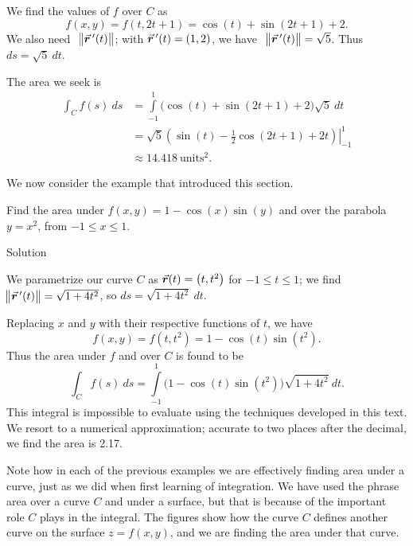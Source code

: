 \begin{example}
We find the values of $f$ over $C$ as $$f(x,y) = f(t,2t+1) = \cos(t)+\sin(2t+1) + 2.$$ We also need \ $\norm{\vec r\,'(t)}$; with $\vrp(t) = \left(1,2\right)$, we have \ $\norm{\vrp(t)} = \sqrt{5}$. Thus $ds = \sqrt{5}\ dt$. 



The area we seek is 
\begin{align*}
\int_Cf(s)\ ds &= \int\limits_{-1}^1 \big(\cos(t)+\sin(2t+1) + 2\big)\sqrt{5}\ dt \\
					&= \left.\sqrt{5}\left(\sin(t) - \frac12\cos(2t+1)+2t\right)\right|_{-1}^1\\
					&\approx 14.418\ \text{units}^2.
\end{align*}



\end{example}

We now consider the example that introduced this section.\\

\begin{example}\label{ex_linescalarfield5}
Find the area under $f(x,y) = 1-\cos(x)\sin(y)$ and over the parabola $y = x^2$, from $-1\leq x\leq 1$. 

Solution 

We parametrize our curve $C$ as $\vrt = \left( t,t^2\right)$ for $-1\leq t\leq 1$; we find $\norm{\vrp(t)} = \sqrt{1+4t^2}$, so $ds = \sqrt{1+4t^2}\ dt$. 

Replacing $x$ and $y$ with their respective functions of $t$, we have $$f(x,y) = f(t,t^2) = 1-\cos(t)\sin\left(t^2\right).$$ Thus the area under $f$ and over $C$ is found to be
$$
\int_C f(s)\ ds = \int\limits_{-1}^1 \Big(1-\cos(t)\sin\left(t^2\right)\Big)\sqrt{1+4t^2}\ dt.$$
This integral is impossible to evaluate using the techniques developed in this text. We resort to a numerical approximation; accurate to two places after the decimal, we find the area is 2.17.

\end{example}

Note how in each of the previous examples we are effectively finding area under a curve, just as we did when first learning of integration. We have used the phrase area over a curve $C$ and under a surface, but that is because of the important role $C$ plays in the integral. The figures show how the curve $C$ defines another curve on the surface $z=f(x,y)$, and we are finding the area under that curve.

